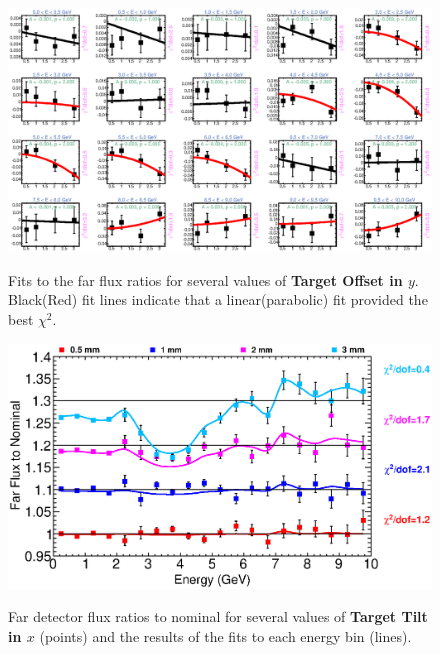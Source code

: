 \begin{figure}[ht]
  \begin{center}
    {\includegraphics[width=5.0in]{figures/TargetYOffset_far_fits.eps}}
  \end{center}
\caption{ Fits to the far flux ratios for several values of {\bf Target Offset in $y$}. Black(Red) fit lines indicate that a linear(parabolic) fit provided the best $\chi^2$. }
\end{figure}

\begin{figure}[ht]
  \begin{center}
    {\includegraphics[width=6.0in]{figures/TargetXTilt_far_summary.eps}}
  \end{center}
\caption{ Far detector flux ratios to nominal for several values of {\bf Target Tilt in $x$} (points) and the results of the fits to each energy bin (lines).}
\end{figure}

